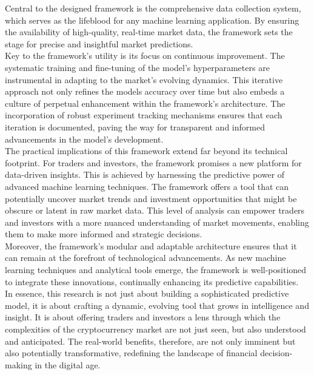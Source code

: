 Central to the designed framework is the comprehensive data collection system, which serves as the lifeblood for any machine learning application. By ensuring the availability of high-quality, real-time market data, the framework sets the stage for precise and insightful market predictions. \\

Key to the framework's utility is its focus on continuous improvement. The systematic training and fine-tuning of the model's hyperparameters are instrumental in adapting to the market's evolving dynamics. This iterative approach not only refines the models accuracy over time but also embeds a culture of perpetual enhancement within the framework's architecture. The incorporation of robust experiment tracking mechanisms ensures that each iteration is documented, paving the way for transparent and informed advancements in the model's development. \\

The practical implications of this framework extend far beyond its technical footprint. For traders and investors, the framework promises a new platform for data-driven insights. This is achieved by harnessing the predictive power of advanced machine learning techniques. The framework offers a tool that can potentially uncover market trends and investment opportunities that might be obscure or latent in raw market data. This level of analysis can empower traders and investors with a more nuanced understanding of market movements, enabling them to make more informed and strategic decisions. \\

Moreover, the framework's modular and adaptable architecture ensures that it can remain at the forefront of technological advancements. As new machine learning techniques and analytical tools emerge, the framework is well-positioned to integrate these innovations, continually enhancing its predictive capabilities. \\

In essence, this research is not just about building a sophisticated predictive model, it is about crafting a dynamic, evolving tool that grows in intelligence and insight. It is about offering traders and investors a lens through which the complexities of the cryptocurrency market are not just seen, but also understood and anticipated. The real-world benefits, therefore, are not only imminent but also potentially transformative, redefining the landscape of financial decision-making in the digital age. \\

